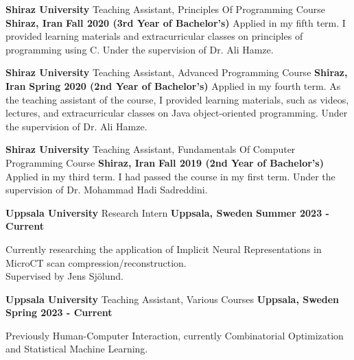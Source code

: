 \begin{cventries}
{    \cventry
    {\textbf{Shiraz University}} %
    {Teaching Assistant, Principles Of Programming Course} %
    {\textbf{Shiraz, Iran}} %
    {\textbf{Fall 2020 (3rd Year of Bachelor’s)}} %
    {
        Applied in my fifth term. I provided learning materials and extracurricular classes on principles of programming using C. Under the supervision of Dr. Ali Hamze.
    }

    \cventry
    {\textbf{Shiraz University}} %
    {Teaching Assistant, Advanced Programming Course} %
    {\textbf{Shiraz, Iran}} %
    {\textbf{Spring 2020 (2nd Year of Bachelor’s)}} %
    {
        Applied in my fourth term. As the teaching assistant of the course, I provided learning materials, such as videos, lectures, and extracurricular classes on Java object-oriented programming. Under the supervision of Dr. Ali Hamze.
    }

    \cventry
    {\textbf{Shiraz University}} %
    {Teaching Assistant, Fundamentals Of Computer Programming Course} %
    {\textbf{Shiraz, Iran}} %
    {\textbf{Fall 2019 (2nd Year of Bachelor’s)}} %
    {
        Applied in my third term. I had passed the course in my first term. Under the supervision of Dr. Mohammad Hadi Sadreddini.
    }
}
{ 
    \cventry
    {\textbf{Uppsala University}} %
    {Research Intern} %
    {\textbf{Uppsala, Sweden}} %
    {\textbf{Summer 2023 - Current}} %
    {
      \begin{cvitems}
        \item Currently researching the application of Implicit Neural Representations in MicroCT scan compression/reconstruction. \\ Supervised by Jens Sjölund.
      \end{cvitems}
    }

    \cventry
    {\textbf{Uppsala University}} %
    {Teaching Assistant, Various Courses} %
    {\textbf{Uppsala, Sweden}} %
    {\textbf{Spring 2023 - Current}} %
    {
      \begin{cvitems}
        \item Previously Human-Computer Interaction, currently Combinatorial Optimization and Statistical Machine Learning.
      \end{cvitems}
    }
    
}
\end{cventries}
